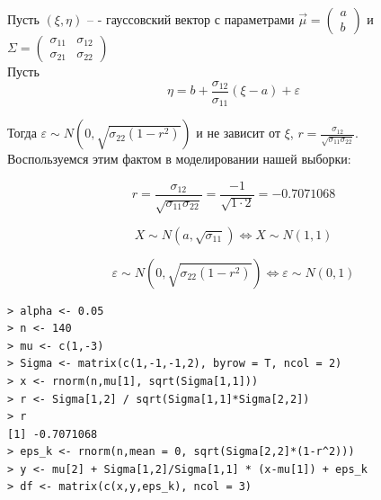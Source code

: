 \documentclass[14pt,a4paper]{scrartcl}
\begin{document}
Пусть $(\xi, \eta)$ -- - гауссовский вектор с параметрами $\vec{\mu} = \begin{pmatrix} a \\ b \end{pmatrix}$ и $\Sigma = \begin{pmatrix}
	\sigma_{11} & \sigma_{12}\\
	\sigma_{21} & \sigma_{22}
\end{pmatrix}$\\
Пусть 
\begin{equation*}
	\eta = b + \frac{\sigma_{12}}{\sigma_{11}}(\xi - a) + \varepsilon
\end{equation*}

Тогда $\varepsilon \sim N(0, \sqrt{\sigma_{22}(1-r^2)})$ и не зависит от $\xi$, $r = \frac{\sigma_{12}}{\sqrt{\sigma_{11}\sigma_{22}}}$.\\	

Воспользуемся этим фактом в моделировании нашей выборки:

\begin{equation*}
r = \frac{\sigma_{12}}{\sqrt{\sigma_{11}\sigma_{22}}} = \frac{-1}{\sqrt{1 \cdot 2}} = -0.7071068
\end{equation*}

\begin{equation*}
	X \sim N(a, \sqrt{\sigma_{11}}) \Leftrightarrow X \sim N(1,1)
\end{equation*}

\begin{equation*}
	\varepsilon \sim N(0, \sqrt{\sigma_{22}(1-r^2)}) \Leftrightarrow \varepsilon \sim N(0,1)
\end{equation*}

\begin{verbatim}
> alpha <- 0.05
> n <- 140
> mu <- c(1,-3)
> Sigma <- matrix(c(1,-1,-1,2), byrow = T, ncol = 2)
> x <- rnorm(n,mu[1], sqrt(Sigma[1,1]))
> r <- Sigma[1,2] / sqrt(Sigma[1,1]*Sigma[2,2])
> r
[1] -0.7071068
> eps_k <- rnorm(n,mean = 0, sqrt(Sigma[2,2]*(1-r^2)))
> y <- mu[2] + Sigma[1,2]/Sigma[1,1] * (x-mu[1]) + eps_k
> df <- matrix(c(x,y,eps_k), ncol = 3)
\end{verbatim}
\end{document}

